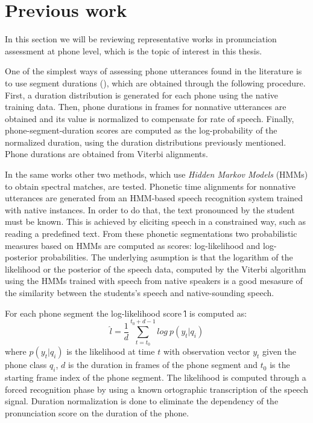 \section{Previous work} \label{section:prev_work}

In this section we will be reviewing representative works in pronunciation assessment
at phone level, which is the topic of interest in this thesis.

One of the simplest ways of assessing phone utterances found in the literature
is to use segment durations (\cite{pronunciation_scoring_instruction, pronunciation_scoring_phone_segments_instruction}), which are obtained through the following
procedure. First, a duration distribution is generated for each phone
using the native training data.
Then, phone durations in frames for nonnative utterances are obtained
and its value is normalized to compensate for rate of speech.
Finally, phone-segment-duration scores are computed as
the log-probability of the normalized duration, using the duration
distributions previously mentioned. Phone durations are obtained from Viterbi alignments.

In the same works other two methods, which use \textit{Hidden Markov Models} (HMMs) to obtain
spectral matches, are tested.
Phonetic time alignments for
nonnative utterances are generated from an HMM-based speech recognition system trained
with native instances. In order to do that, the text pronounced by the student
must be known. This is achieved by eliciting speech in a
constrained way, such as reading a predefined text.
From these phonetic segmentations two
probabilistic measures based on HMMs are computed as scores: log-likelihood and
log-posterior probabilities. The underlying asumption is that the logarithm of the likelihood
or the posterior of the speech data, computed by the Viterbi
algorithm using the HMMs trained with speech from native
speakers is a good mesasure of the similarity between the students's
speech and native-sounding speech.

For each phone segment the log-likelihood score \^{l} is computed as:
\begin{equation}
\label{eq:logLikelihood}
\hat{l} = \frac{1}{d} \sum_{t=t_{0}}^{t_{0}+d-1} log \ p(y_{t}|q_{i})
\end{equation}
where $p(y_{t}|q_{i})$ is the likelihood at time $t$ with observation vector $y_{t}$
given the phone class $q_{i}$, $d$ is the duration in frames of the phone segment
and $t_{0}$ is the starting frame index of the phone segment.
The likelihood is computed through a forced recognition phase by using a known ortographic
transcription of the speech signal. Duration normalization is done to
eliminate the dependency of the pronunciation score on the duration of the phone.

